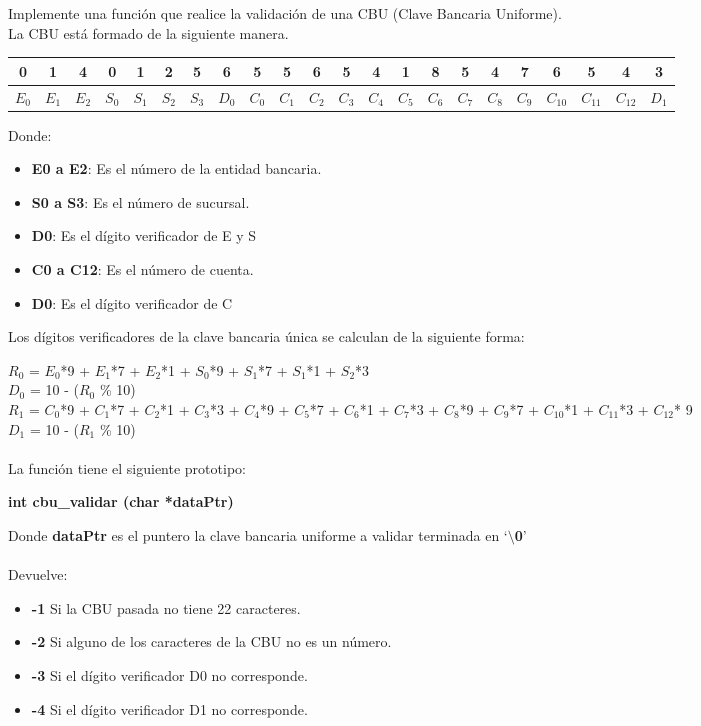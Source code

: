 \documentclass[12pt]{article} %
\begin{document}
Implemente una función que realice la validación de una CBU (Clave Bancaria Uniforme).\\
La CBU está formado de la siguiente manera.\\
\fontsize{9pt}{9pt}\selectfont
\vspace{-0.6cm}
\begin{center} 
   \begin{tabular}{|c|c|c|c|c|c|c|c|c|c|c|c|c|c|c|c|c|c|c|c|c|c|}
    \hline 
     0&1&4&0&1&2&5&6&5&5&6&5&4&1&8&5&4&7&6&5&4&3 \\ \hline 
     $E_0$&$E_1$&$E_2$&$S_0$&$S_1$&$S_2$&$S_3$&$D_0$&$C_0$&$C_1$&$C_2$&$C_3$&$C_4$&$C_5$&$C_6$&
     $C_7$&$C_8$&$C_9$&$C_{10}$&$C_{11}$&$C_{12}$&$D_1$\\ \hline 
   \end{tabular}
\end{center}   	
\fontsize{12pt}{12pt}\selectfont
Donde:
\begin{itemize}
\item {\bf E0 a E2}: Es el número de la entidad bancaria.
\item {\bf S0 a S3}: Es el número de sucursal.
\item {\bf D0}: Es el dígito verificador de E y S
\item {\bf C0 a C12}: Es el número de cuenta.
\item {\bf D0}: Es el dígito verificador de C
\end{itemize}
Los dígitos verificadores de la clave bancaria única se calculan de la siguiente forma:\\
\fontsize{10.4pt}{10.4pt}\selectfont

$R_0$ = $E_0$*9 + $E_1$*7 + $E_2$*1 + $S_0$*9 + $S_1$*7 + $S_1$*1 + $S_2$*3 \\
$D_0$ = 10 - ($R_0$ \% 10)\\

$R_1$ = $C_0$*9 + $C_1$*7 + $C_2$*1 + $C_3$*3 + $C_4$*9 + $C_5$*7 + $C_6$*1 + $C_7$*3 + $C_8$*9 + $C_9$*7 + $C_{10}$*1 + $C_{11}$*3  + $C_{12}$* 9\\
$D_1$ = 10 - ($R_1$ \% 10)\\
\fontsize{12pt}{12pt}\selectfont
\\
La función tiene el siguiente prototipo:
\begin{center}
{\bf int cbu\_validar (char *dataPtr)}
\end{center}
Donde {\bf dataPtr} es el puntero la clave bancaria uniforme a validar terminada en ‘{\bf $\setminus$0}’\\
\\
Devuelve:
\begin{itemize}
\item {\bf -1} Si la CBU pasada no tiene 22 caracteres.
\item {\bf -2} Si alguno de los caracteres de la CBU no es un número.
\item {\bf -3} Si el dígito verificador D0 no corresponde.
\item {\bf -4} Si el dígito verificador D1 no corresponde.
\end{itemize}
 
\end{document}

